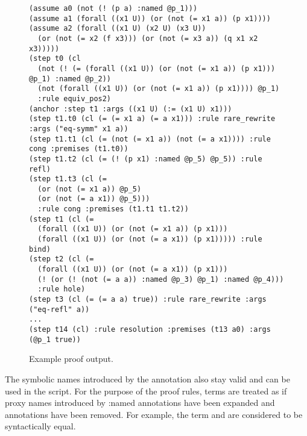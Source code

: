 \begin{figure}
\begin{lstlisting}[language=SMT]
(assume a0 (not (! (p a) :named @p_1)))
(assume a1 (forall ((x1 U)) (or (not (= x1 a)) (p x1))))
(assume a2 (forall ((x1 U) (x2 U) (x3 U))
  (or (not (= x2 (f x3))) (or (not (= x3 a)) (q x1 x2 x3)))))
(step t0 (cl 
  (not (! (= (forall ((x1 U)) (or (not (= x1 a)) (p x1))) @p_1) :named @p_2))
  (not (forall ((x1 U)) (or (not (= x1 a)) (p x1)))) @p_1)
  :rule equiv_pos2)
(anchor :step t1 :args ((x1 U) (:= (x1 U) x1)))
(step t1.t0 (cl (= (= x1 a) (= a x1))) :rule rare_rewrite :args ("eq-symm" x1 a))
(step t1.t1 (cl (= (not (= x1 a)) (not (= a x1)))) :rule cong :premises (t1.t0))
(step t1.t2 (cl (= (! (p x1) :named @p_5) @p_5)) :rule refl)
(step t1.t3 (cl (= 
  (or (not (= x1 a)) @p_5)
  (or (not (= a x1)) @p_5)))
  :rule cong :premises (t1.t1 t1.t2))
(step t1 (cl (=
  (forall ((x1 U)) (or (not (= x1 a)) (p x1)))
  (forall ((x1 U)) (or (not (= a x1)) (p x1))))) :rule bind)
(step t2 (cl (= 
  (forall ((x1 U)) (or (not (= a x1)) (p x1)))
  (! (or (! (not (= a a)) :named @p_3) @p_1) :named @p_4)))
  :rule hole)
(step t3 (cl (= (= a a) true)) :rule rare_rewrite :args ("eq-refl" a))
...
(step t14 (cl) :rule resolution :premises (t13 a0) :args (@p_1 true))
\end{lstlisting}
\caption{Example proof output.}
\label{fig:syntax-alethe-example}
\end{figure}


The symbolic names introduced by the  annotation also stay valid and can be used in the script. For the purpose of
the proof rules, terms are treated as if proxy names introduced by :named annotations have been expanded and annotations have been removed.
For example, the term  and  are considered to be syntactically equal.


